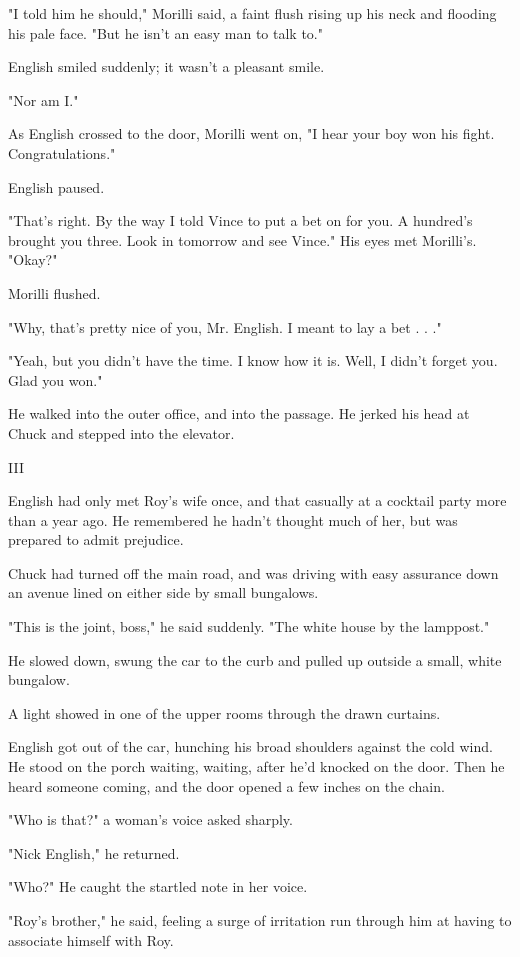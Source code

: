 \documentclass{novel}
\begin{document}
"I told him he should," Morilli said, a faint flush rising up his neck and flooding his pale face. "But he isn't an easy man to talk to."

English smiled suddenly; it wasn't a pleasant smile.

"Nor am I."

As English crossed to the door, Morilli went on, "I hear your boy won his fight. Congratulations."

English paused.

"That's right. By the way I told Vince to put a bet on for you. A hundred's brought you three. Look in tomorrow and see Vince." His eyes met Morilli's. "Okay?"

Morilli flushed.

"Why, that's pretty nice of you, Mr. English. I meant to lay a bet . . ."

"Yeah, but you didn't have the time. I know how it is. Well, I didn't forget you. Glad you won."

He walked into the outer office, and into the passage. He jerked his head at Chuck and stepped into the elevator.



III

English had only met Roy's wife once, and that casually at a cocktail party more than a year ago. He remembered he hadn't thought much of her, but was prepared to admit prejudice.

Chuck had turned off the main road, and was driving with easy assurance down an avenue lined on either side by small bungalows.

"This is the joint, boss," he said suddenly. "The white house by the lamppost."

He slowed down, swung the car to the curb and pulled up outside a small, white bungalow.

A light showed in one of the upper rooms through the drawn curtains.

English got out of the car, hunching his broad shoulders against the cold wind. He stood on the porch waiting, waiting, after he'd knocked on the door. Then he heard someone coming, and the door opened a few inches on the chain.

"Who is that?" a woman's voice asked sharply.

"Nick English," he returned.

"Who?" He caught the startled note in her voice.

"Roy's brother," he said, feeling a surge of irritation run through him at having to associate himself with Roy.
\end{document}

